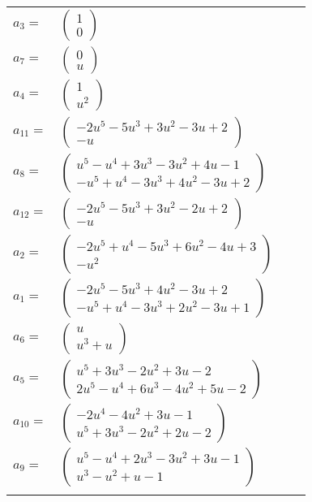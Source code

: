 \documentclass[1p]{elsarticle_modified}
\theoremstyle{definition}
\begin{document}
\begin{tabular}{m{7pt} m{180pt} m{7pt} m{180pt} }
\flushright $a_{3}=$&$\begin{pmatrix}1\\0\end{pmatrix}$ \\
\flushright $a_{7}=$&$\begin{pmatrix}0\\u\end{pmatrix}$ \\
\flushright $a_{4}=$&$\begin{pmatrix}1\\u^2\end{pmatrix}$ \\
\flushright $a_{11}=$&$\begin{pmatrix}-2 u^5-5 u^3+3 u^2-3 u+2\\- u\end{pmatrix}$ \\
\flushright $a_{8}=$&$\begin{pmatrix}u^5- u^4+3 u^3-3 u^2+4 u-1\\- u^5+u^4-3 u^3+4 u^2-3 u+2\end{pmatrix}$ \\
\flushright $a_{12}=$&$\begin{pmatrix}-2 u^5-5 u^3+3 u^2-2 u+2\\- u\end{pmatrix}$ \\
\flushright $a_{2}=$&$\begin{pmatrix}-2 u^5+u^4-5 u^3+6 u^2-4 u+3\\- u^2\end{pmatrix}$ \\
\flushright $a_{1}=$&$\begin{pmatrix}-2 u^5-5 u^3+4 u^2-3 u+2\\- u^5+u^4-3 u^3+2 u^2-3 u+1\end{pmatrix}$ \\
\flushright $a_{6}=$&$\begin{pmatrix}u\\u^3+u\end{pmatrix}$ \\
\flushright $a_{5}=$&$\begin{pmatrix}u^5+3 u^3-2 u^2+3 u-2\\2 u^5- u^4+6 u^3-4 u^2+5 u-2\end{pmatrix}$ \\
\flushright $a_{10}=$&$\begin{pmatrix}-2 u^4-4 u^2+3 u-1\\u^5+3 u^3-2 u^2+2 u-2\end{pmatrix}$ \\
\flushright $a_{9}=$&$\begin{pmatrix}u^5- u^4+2 u^3-3 u^2+3 u-1\\u^3- u^2+u-1\end{pmatrix}$\\&\end{tabular}
\end{document}
